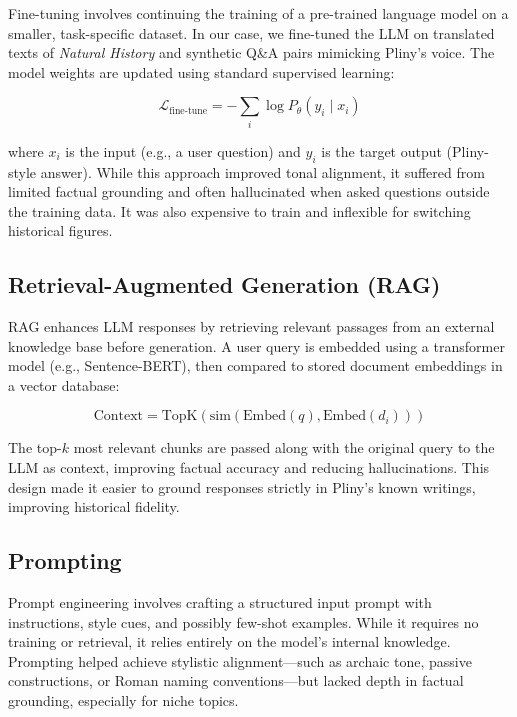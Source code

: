 \documentclass[sigconf]{aamas}
\begin{document}
Fine-tuning involves continuing the training of a pre-trained language model on a smaller, task-specific dataset. In our case, we fine-tuned the LLM on translated texts of \textit{Natural History} and synthetic Q\&A pairs mimicking Pliny’s voice. The model weights are updated using standard supervised learning:

$$\mathcal{L}_{\text{fine-tune}} = - \sum_{i} \log P_{\theta}(y_i \mid x_i)$$

where $x_i$ is the input (e.g., a user question) and $y_i$ is the target output (Pliny-style answer). While this approach improved tonal alignment, it suffered from limited factual grounding and often hallucinated when asked questions outside the training data. It was also expensive to train and inflexible for switching historical figures.

\subsection{Retrieval-Augmented Generation (RAG)}

RAG enhances LLM responses by retrieving relevant passages from an external knowledge base before generation. A user query is embedded using a transformer model (e.g., Sentence-BERT), then compared to stored document embeddings in a vector database:

\begin{equation}
    \text{Context} = \text{TopK} \left( \text{sim} \left( \text{Embed}(q), \text{Embed}(d_i) \right) \right)
\end{equation}

The top-$k$ most relevant chunks are passed along with the original query to the LLM as context, improving factual accuracy and reducing hallucinations. This design made it easier to ground responses strictly in Pliny's known writings, improving historical fidelity.

\subsection{Prompting}

Prompt engineering involves crafting a structured input prompt with instructions, style cues, and possibly few-shot examples. While it requires no training or retrieval, it relies entirely on the model’s internal knowledge. Prompting helped achieve stylistic alignment—such as archaic tone, passive constructions, or Roman naming conventions—but lacked depth in factual grounding, especially for niche topics.
\end{document}
